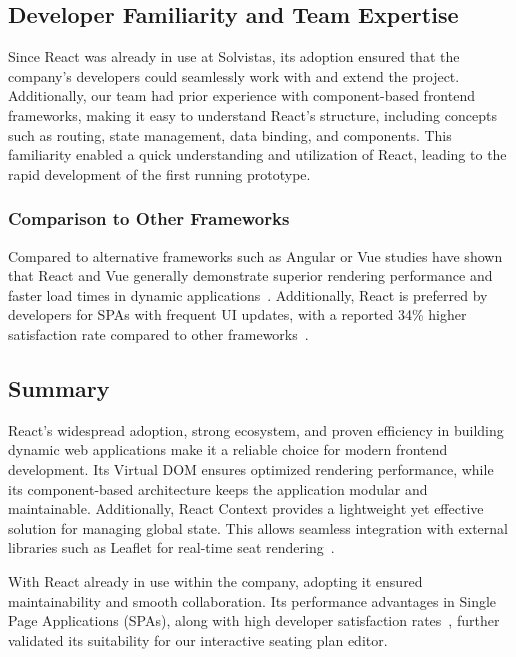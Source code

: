 \subsection{Developer Familiarity and Team Expertise}
Since React was already in use at Solvistas, its adoption ensured that the company’s developers could seamlessly work with and extend the project. Additionally, our team had prior experience with component-based frontend frameworks, making it easy to understand React’s structure, including concepts such as routing, state management, data binding, and components. This familiarity enabled a quick understanding and utilization of React, leading to the rapid development of the first running prototype.

\subsubsection{Comparison to Other Frameworks}
Compared to alternative frameworks such as Angular or Vue studies have shown that React and Vue generally demonstrate superior rendering performance and faster load times in dynamic applications~\cite{SPAComp}. Additionally, React is preferred by developers for SPAs with frequent UI updates, with a reported 34\% higher satisfaction rate compared to other frameworks~\cite{SPAComp}. 

\subsection{Summary}
React’s widespread adoption, strong ecosystem, and proven efficiency in building dynamic web applications make it a reliable choice for modern frontend development. Its Virtual DOM ensures optimized rendering performance, while its component-based architecture keeps the application modular and maintainable. Additionally, React Context provides a lightweight yet effective solution for managing global state. This allows seamless integration with external libraries such as Leaflet for real-time seat rendering~\cite{ReactVirtualDOM, ReactCBA01}. 

With React already in use within the company, adopting it ensured maintainability and smooth collaboration. Its performance advantages in Single Page Applications (SPAs), along with high developer satisfaction rates~\cite{SPAComp}, further validated its suitability for our interactive seating plan editor.

